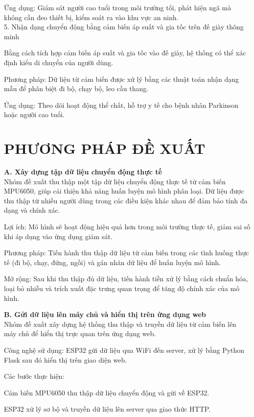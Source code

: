\documentclass[journal]{IEEEtran}
\begin{document}
Ứng dụng: Giám sát người cao tuổi trong môi trường tối, phát hiện ngã mà không cần đeo thiết bị, kiểm soát ra vào khu vực an ninh.\\

5. Nhận dạng chuyển động bằng cảm biến áp suất và gia tốc trên đế giày thông minh

Bằng cách tích hợp cảm biến áp suất và gia tốc vào đế giày, hệ thống có thể xác định kiểu di chuyển của người dùng.

Phương pháp: Dữ liệu từ cảm biến được xử lý bằng các thuật toán nhận dạng mẫu để phân biệt đi bộ, chạy bộ, leo cầu thang.

Ứng dụng: Theo dõi hoạt động thể chất, hỗ trợ y tế cho bệnh nhân Parkinson hoặc người cao tuổi.

\section{PHƯƠNG PHÁP ĐỀ XUẤT}
\textbf{A.  Xây dựng tập dữ liệu chuyển động thực tế}\\
Nhóm đề xuất thu thập một tập dữ liệu chuyển động thực tế từ cảm biến MPU6050, giúp cải thiện khả năng huấn luyện mô hình phân loại. Dữ liệu được thu thập từ nhiều người dùng trong các điều kiện khác nhau để đảm bảo tính đa dạng và chính xác.

Lợi ích: Mô hình sẽ hoạt động hiệu quả hơn trong môi trường thực tế, giảm sai số khi áp dụng vào ứng dụng giám sát.

Phương pháp: Tiến hành thu thập dữ liệu từ cảm biến trong các tình huống thực tế (đi bộ, chạy, đứng, ngồi) và gán nhãn dữ liệu để huấn luyện mô hình.

Mở rộng: Sau khi thu thập đủ dữ liệu, tiến hành tiền xử lý bằng cách chuẩn hóa, loại bỏ nhiễu và trích xuất đặc trưng quan trọng để tăng độ chính xác của mô hình.

\textbf{B. Gửi dữ liệu lên máy chủ và hiển thị trên ứng dụng web}\\
Nhóm đề xuất xây dựng hệ thống thu thập và truyền dữ liệu từ cảm biến lên máy chủ để hiển thị trực quan trên ứng dụng web.

Công nghệ sử dụng: ESP32 gửi dữ liệu qua WiFi đến server, xử lý bằng Python Flask  sau đó hiển thị trên giao diện web.

Các bước thực hiện:

Cảm biến MPU6050 thu thập dữ liệu chuyển động và gửi về ESP32.

ESP32 xử lý sơ bộ và truyền dữ liệu lên server qua giao thức HTTP.
\end{document}
